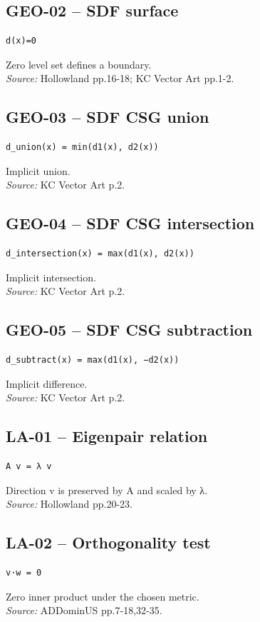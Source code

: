 \documentclass{article}
\begin{document}
\subsection*{GEO-02 -- SDF surface}
\begin{verbatim}
d(x)=0
\end{verbatim}
Zero level set defines a boundary.\\
\textit{Source:} Hollowland pp.16-18; KC Vector Art pp.1-2.
\subsection*{GEO-03 -- SDF CSG union}
\begin{verbatim}
d_union(x) = min(d1(x), d2(x))
\end{verbatim}
Implicit union.\\
\textit{Source:} KC Vector Art p.2.
\subsection*{GEO-04 -- SDF CSG intersection}
\begin{verbatim}
d_intersection(x) = max(d1(x), d2(x))
\end{verbatim}
Implicit intersection.\\
\textit{Source:} KC Vector Art p.2.
\subsection*{GEO-05 -- SDF CSG subtraction}
\begin{verbatim}
d_subtract(x) = max(d1(x), −d2(x))
\end{verbatim}
Implicit difference.\\
\textit{Source:} KC Vector Art p.2.
\subsection*{LA-01 -- Eigenpair relation}
\begin{verbatim}
A v = λ v
\end{verbatim}
Direction v is preserved by A and scaled by λ.\\
\textit{Source:} Hollowland pp.20-23.
\subsection*{LA-02 -- Orthogonality test}
\begin{verbatim}
v·w = 0
\end{verbatim}
Zero inner product under the chosen metric.\\
\textit{Source:} ADDominUS pp.7-18,32-35.
\end{document}
